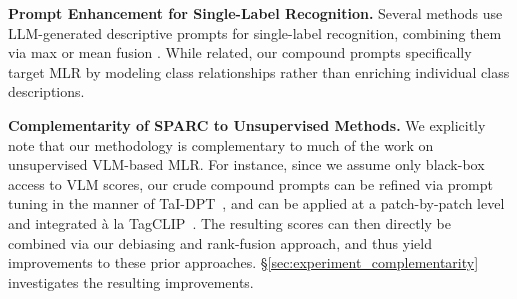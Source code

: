 \noindent\textbf{Prompt Enhancement for Single-Label Recognition.} Several methods use LLM-generated descriptive prompts for single-label recognition, combining them via max or mean fusion \cite{CuPL,DCLIP,FuDD,CHiLS}. While related, our compound prompts specifically target MLR by modeling class relationships rather than enriching individual class descriptions.

\noindent \textbf{Complementarity of SPARC to Unsupervised Methods.} We explicitly note that our methodology is complementary to much of the work on unsupervised VLM-based MLR. For instance, since we assume only black-box access to VLM scores, our crude compound prompts can be refined via prompt tuning in the manner of TaI-DPT~\cite{TaI-DPT}, and can be applied at a patch-by-patch level and integrated \`{a} la TagCLIP~\cite{TagCLIP}. The resulting scores can then directly be combined via our debiasing and rank-fusion approach, and thus yield improvements to these prior approaches. \S\ref{sec:experiment_complementarity} investigates the resulting improvements. 















